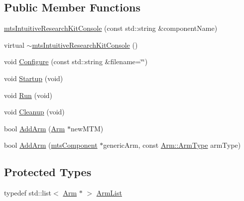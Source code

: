 \subsection*{Public Member Functions}
\begin{DoxyCompactItemize}
\item 
\hyperlink{classmts_intuitive_research_kit_console_ac35e521263fc5019b4fe0d2540bc4688}{mts\+Intuitive\+Research\+Kit\+Console} (const std\+::string \&component\+Name)
\item 
virtual \hyperlink{classmts_intuitive_research_kit_console_ad4ccebcacb7c58f67408a320f7806087}{$\sim$mts\+Intuitive\+Research\+Kit\+Console} ()
\item 
void \hyperlink{classmts_intuitive_research_kit_console_a9c424612ad46c323f1d620c85d4b2cb6}{Configure} (const std\+::string \&filename=\char`\"{}\char`\"{})
\item 
void \hyperlink{classmts_intuitive_research_kit_console_a15a0d6dd7789ea68f27f431c02b7567d}{Startup} (void)
\item 
void \hyperlink{classmts_intuitive_research_kit_console_ad43239998cb5751d31491cdcf5330ba1}{Run} (void)
\item 
void \hyperlink{classmts_intuitive_research_kit_console_a7e2319e21dc925a67d43945abad7cf6b}{Cleanup} (void)
\item 
bool \hyperlink{classmts_intuitive_research_kit_console_a2b43a402a2dba09c55701c2f957aee85}{Add\+Arm} (\hyperlink{classmts_intuitive_research_kit_console_1_1_arm}{Arm} $\ast$new\+M\+T\+M)
\item 
bool \hyperlink{classmts_intuitive_research_kit_console_a27e2a757cfc2e6420bdaf8bc4f0e7adf}{Add\+Arm} (\hyperlink{classmts_component}{mts\+Component} $\ast$generic\+Arm, const \hyperlink{classmts_intuitive_research_kit_console_1_1_arm_acb898ba65d323f59ffd0885a47ef6cec}{Arm\+::\+Arm\+Type} arm\+Type)
\end{DoxyCompactItemize}
\subsection*{Protected Types}
\begin{DoxyCompactItemize}
\item 
typedef std\+::list$<$ \hyperlink{classmts_intuitive_research_kit_console_1_1_arm}{Arm} $\ast$ $>$ \hyperlink{classmts_intuitive_research_kit_console_af9f8efcf17fe738d0143b3ea418198dd}{Arm\+List}
\end{DoxyCompactItemize}
